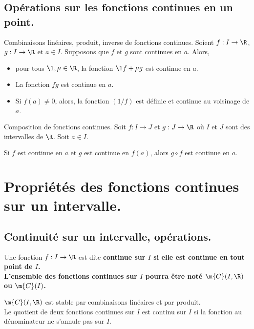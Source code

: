 \documentclass[11pt]{article}
\begin{document}
\subsection{Opérations sur les fonctions continues en un point.}

\begin{prop}{Combinaisons linéaires, produit, inverse de fonctions continues.}{}
    Soient $f:I\to\R$, $g:I\to\R$ et $a\in I$. Supposons que $f$ et $g$ sont continues en $a$. Alors,
    \begin{itemize}
        \item pour tous $\l,\mu\in\R$, la fonction $\l f + \mu g$ est continue en $a$.
        \item La fonction $fg$ est continue en $a$.
        \item Si $f(a)\neq0$, alors, la fonction $(1/f)$ est définie et continue au voisinage de $a$.
    \end{itemize}
\end{prop}

\begin{prop}{Composition de fonctions continues.}{}
    Soit $f:I\to J$ et $g:J\to\R$ où $I$ et $J$ sont des intervalles de $\R$. Soit $a\in I$.
    \begin{center}
        Si $f$ est continue en $a$ et $g$ est continue en $f(a)$, alors $g\circ f$ est continue en $a$.
    \end{center}
\end{prop}

\section{Propriétés des fonctions continues sur un intervalle.}

\subsection{Continuité sur un intervalle, opérations.}

\begin{defi}{}{}
    Une fonction $f:I\to\R$ est dite \bf{continue sur $I$} si elle est continue en tout point de $I$.\\
    L'ensemble des fonctions continues sur $I$ pourra être noté $\m{C}(I,\R)$ ou $\m{C}(I)$.
\end{defi}

\vspace*{-0.4cm}

\begin{prop}{}{}
    $\m{C}(I,\R)$ est stable par combinaisons linéaires et par produit.\\
    Le quotient de deux fonctions continues sur $I$ est continu sur $I$ si la fonction au dénominateur ne s'annule pas sur $I$.
\end{prop}
\end{document}

